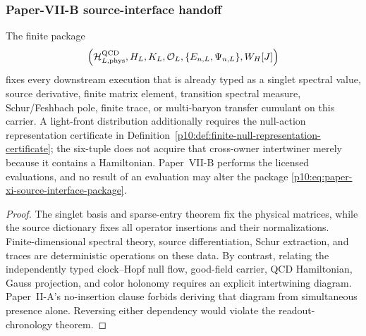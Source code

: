 \documentclass[12pt,a4paper]{article}
\begin{document}



\subsubsection{Paper-VII-B source-interface handoff}
\label{p10:subsec:paper-xi-source-interface-handoff}

\begin{theorem}
\label{p10:thm:source-interface-handoff}
The finite package
\begin{equation}
\label{p10:eq:paper-xi-source-interface-package}
\left(
\mathcal H_{L,\rm phys}^{\rm QCD},
H_L,
K_L,
\mathcal O_L,
\{E_{n,L},\Psi_{n,L}\},
W_H[J]
\right)
\end{equation}
fixes every downstream execution that is already typed as a singlet spectral
value, source derivative, finite matrix element, transition spectral measure,
Schur/Feshbach pole, finite trace, or multi-baryon transfer cumulant on this
carrier.  A light-front distribution additionally requires the null-action
representation certificate in
Definition~\ref{p10:def:finite-null-representation-certificate}; the six-tuple
does not acquire that cross-owner intertwiner merely because it contains a
Hamiltonian.  Paper~VII-B performs the licensed evaluations, and no result of an
evaluation may alter the package
\eqref{p10:eq:paper-xi-source-interface-package}.
\end{theorem}
\begin{proof}
The singlet basis and sparse-entry theorem fix the physical matrices, while the
source dictionary fixes all operator insertions and their normalizations.
Finite-dimensional spectral theory, source differentiation, Schur extraction,
and traces are deterministic operations on these data.  By contrast, relating
the independently typed clock--Hopf null flow, good-field carrier, QCD
Hamiltonian, Gauss projection, and color holonomy requires an explicit
intertwining diagram.  Paper~II-A's no-insertion clause forbids deriving that
diagram from simultaneous presence alone.  Reversing either dependency would
violate the readout-chronology theorem.
\end{proof}
\end{document}
